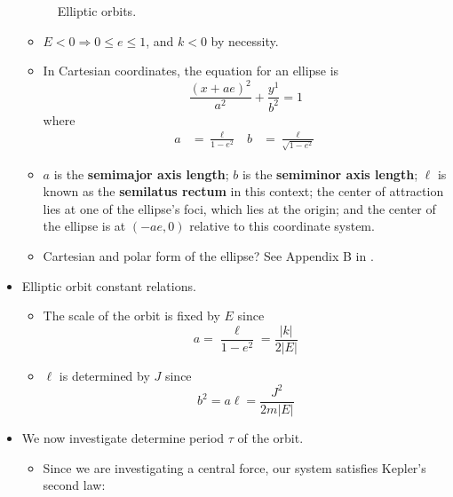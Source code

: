 \documentclass[../notes.tex]{subfiles}
\begin{document}
\begin{itemize}
\begin{figure}[h!]
        \caption{Elliptic orbits.}
        \label{fig:orbitsElliptic}
    \end{figure}
    \begin{itemize}
        \item $E<0\Longrightarrow 0\leq e\leq 1$, and $k<0$ by necessity.
        \item In Cartesian coordinates, the equation for an ellipse is
        \begin{equation*}
            \frac{(x+ae)^2}{a^2}+\frac{y^1}{b^2} = 1
        \end{equation*}
        where
        \begin{align*}
            a &= \frac{\ell}{1-e^2}&
            b &= \frac{\ell}{\sqrt{1-e^2}}
        \end{align*}
        \item $a$ is the \textbf{semimajor axis length}; $b$ is the \textbf{semiminor axis length}; $\ell$ is known as the \textbf{semilatus rectum} in this context; the center of attraction lies at one of the ellipse's foci, which lies at the origin; and the center of the ellipse is at $(-ae,0)$ relative to this coordinate system.
        \item Cartesian and polar form of the ellipse? See Appendix B in \textcite{bib:KibbleBerkshire}.
    \end{itemize}
    \item Elliptic orbit constant relations.
    \begin{itemize}
        \item The scale of the orbit is fixed by $E$ since
        \begin{equation*}
            a = \frac{\ell}{1-e^2} = \frac{|k|}{2|E|}
        \end{equation*}
        \item $\ell$ is determined by $J$ since
        \begin{equation*}
            b^2 = a\ell = \frac{J^2}{2m|E|}
        \end{equation*}
    \end{itemize}
    \item We now investigate determine period $\tau$ of the orbit.
    \begin{itemize}
        \item Since we are investigating a central force, our system satisfies Kepler's second law:
        \begin{equation*}

\end{equation*}
\end{itemize}
\end{itemize}
\end{document}
